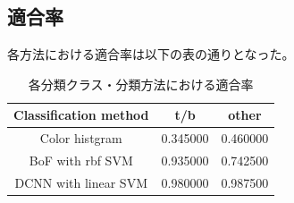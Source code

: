 \documentclass[11pt,a4paper, uplatex]{jsreport}
\begin{document}
\subsection{適合率}
各方法における適合率は以下の表の通りとなった。
\begin{table}[h]
  \caption{各分類クラス・分類方法における適合率}
  \label{tb:accuracy}
  \begin{center}
    \begin{tabular}{ccc} \hline
      Classification method & t/b & other \\ \hline
      Color histgram & 0.345000 & 0.460000 \\
      BoF with rbf SVM & 0.935000 & 0.742500 \\
      DCNN with linear SVM & 0.980000 & 0.987500 \\ \hline
    \end{tabular}
  \end{center}
\end{table}
\end{document}
